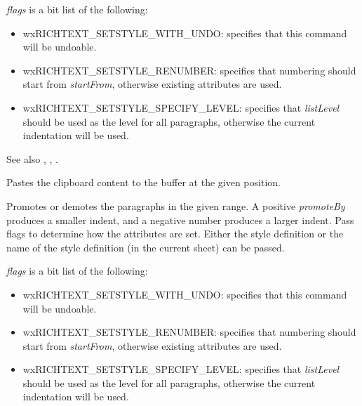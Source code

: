 {\it flags} is a bit list of the following:

\begin{itemize}\itemsep=0pt
\item wxRICHTEXT\_SETSTYLE\_WITH\_UNDO: specifies that this command will be undoable.
\item wxRICHTEXT\_SETSTYLE\_RENUMBER: specifies that numbering should start from {\it startFrom}, otherwise existing attributes are used.
\item wxRICHTEXT\_SETSTYLE\_SPECIFY\_LEVEL: specifies that {\it listLevel} should be used as the level for all paragraphs, otherwise the current indentation will be used.
\end{itemize}

See also , , .

\label{wxrichtextbufferpastefromclipboard}


Pastes the clipboard content to the buffer at the given position.

\label{wxrichtextbufferpromotelist}



Promotes or demotes the paragraphs in the given range. A positive {\it promoteBy} produces a smaller indent, and a negative number
produces a larger indent. Pass flags to determine how the attributes are set.
Either the style definition or the name of the style definition (in the current sheet) can be passed.

{\it flags} is a bit list of the following:

\begin{itemize}\itemsep=0pt
\item wxRICHTEXT\_SETSTYLE\_WITH\_UNDO: specifies that this command will be undoable.
\item wxRICHTEXT\_SETSTYLE\_RENUMBER: specifies that numbering should start from {\it startFrom}, otherwise existing attributes are used.
\item wxRICHTEXT\_SETSTYLE\_SPECIFY\_LEVEL: specifies that {\it listLevel} should be used as the level for all paragraphs, otherwise the current indentation will be used.
\end{itemize}

